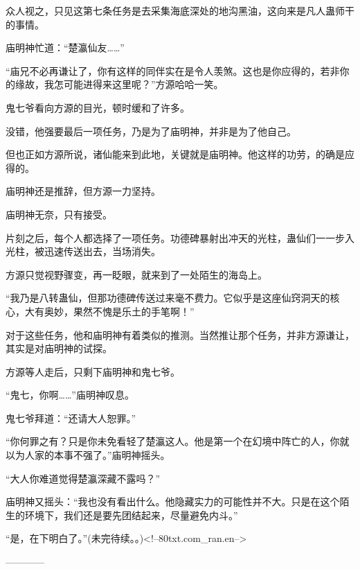 \begin{this_body}
众人视之，只见这第七条任务是去采集海底深处的地沟黑油，这向来是凡人蛊师干的事情。

庙明神忙道：“楚瀛仙友……”

“庙兄不必再谦让了，你有这样的同伴实在是令人羡煞。这也是你应得的，若非你的缘故，我怎可能进得来这里呢？”方源哈哈一笑。

鬼七爷看向方源的目光，顿时缓和了许多。

没错，他强要最后一项任务，乃是为了庙明神，并非是为了他自己。

但也正如方源所说，诸仙能来到此地，关键就是庙明神。他这样的功劳，的确是应得的。

庙明神还是推辞，但方源一力坚持。

庙明神无奈，只有接受。

片刻之后，每个人都选择了一项任务。功德碑暴射出冲天的光柱，蛊仙们一一步入光柱，被迅速传送出去，当场消失。

方源只觉视野骤变，再一眨眼，就来到了一处陌生的海岛上。

“我乃是八转蛊仙，但那功德碑传送过来毫不费力。它似乎是这座仙窍洞天的核心，大有奥妙，果然不愧是乐土的手笔啊！”

对于这些任务，他和庙明神有着类似的推测。当然推让那个任务，并非方源谦让，其实是对庙明神的试探。

方源等人走后，只剩下庙明神和鬼七爷。

“鬼七，你啊……”庙明神叹息。

鬼七爷拜道：“还请大人恕罪。”

“你何罪之有？只是你未免看轻了楚瀛这人。他是第一个在幻境中阵亡的人，你就以为人家的本事不强了。”庙明神摇头。

“大人你难道觉得楚瀛深藏不露吗？”

庙明神又摇头：“我也没有看出什么。他隐藏实力的可能性并不大。只是在这个陌生的环境下，我们还是要先团结起来，尽量避免内斗。”

“是，在下明白了。”(未完待续。。)<!--80txt.com\_ran.en-->

------------

\end{this_body}

